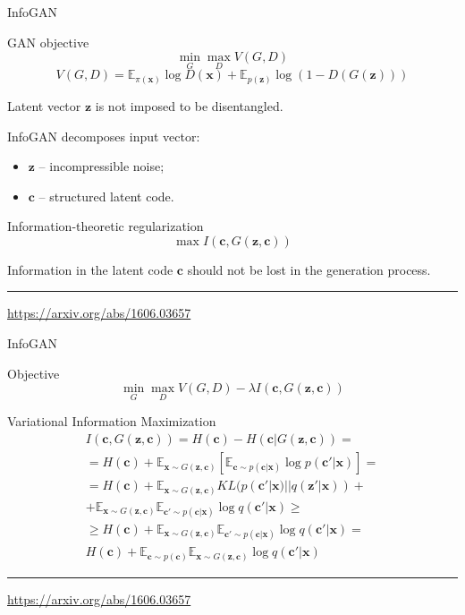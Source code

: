 \documentclass{beamer}
\newcommand{\bc}{\mathbf{c}}
\newcommand{\bx}{\mathbf{x}}
\newcommand{\bz}{\mathbf{z}}
\newcommand{\bbE}{\mathbb{E}}
\begin{document}
\begin{frame}{InfoGAN}
	\begin{block}{GAN objective}
		\vspace{-0.3cm}
		\[
		\min_{G} \max_D V(G, D)
		\]
		\[
		V(G, D)  =  \bbE_{\pi(\bx)} \log D(\bx) + \bbE_{p(\bz)} \log (1 - D(G(\bz)))
		\]
	\end{block}
	Latent vector $\bz$ is not imposed to be disentangled.
	
	InfoGAN decomposes input vector:
	\begin{itemize}
		\item $\bz$ -- incompressible noise;
		\item $\bc$ -- structured latent code.
	\end{itemize}
	\begin{block}{Information-theoretic regularization}
		\vspace{-0.3cm}
		\[
			\max I (\bc, G(\bz, \bc))
		\]
	\end{block}
	Information in the latent code $\bc$ should not be lost in the generation process.
	\vfill
	\hrule\medskip
	{\scriptsize \href{https://arxiv.org/abs/1606.03657}{https://arxiv.org/abs/1606.03657}}
\end{frame}
\begin{frame}{InfoGAN}
	\begin{block}{Objective}
		\vspace{-0.3cm}
		\[
		\min_{G} \max_D V(G, D) - \lambda I (\bc, G(\bz, \bc))
		\]
	\end{block}
	\begin{block}{Variational Information Maximization}
		\begin{multline*}
		I (\bc, G(\bz, \bc)) = H(\bc) - H(\bc | G(\bz, \bc)) = \\
		= H(\bc) + \bbE_{\bx \sim G(\bz, \bc)} \left[ \bbE_{\bc \sim p(\bc | \bx)} \log p(\bc' | \bx) \right] = \\ 
		= H(\bc) + \bbE_{\bx \sim G(\bz, \bc)} KL(p(\bc'| \bx) || q(\bz' | \bx)) + 
		\\ + \bbE_{\bx \sim G(\bz, \bc)}  \bbE_{\bc' \sim p(\bc | \bx)} \log q(\bc' | \bx)  \geq\\
		 \geq H(\bc) + \bbE_{\bx \sim G(\bz, \bc)} \bbE_{\bc' \sim p(\bc | \bx)} \log q(\bc' | \bx) = \\
		 H(\bc) + \bbE_{\bc \sim p(\bc)} \bbE_{\bx \sim G(\bz, \bc)} \log q(\bc' | \bx)
		\end{multline*}
	\end{block}
	\vfill
	\hrule\medskip
	{\scriptsize \href{https://arxiv.org/abs/1606.03657}{https://arxiv.org/abs/1606.03657}}
\end{frame}
\end{document}
